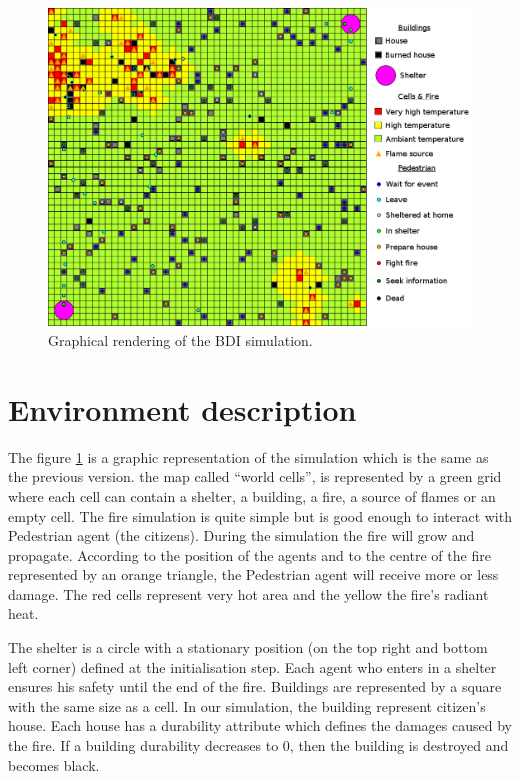 \documentclass[12pt, a4paper]{memoir} %
\begin{document}
	\begin{figure}
		\begin{center}
			\includegraphics[scale=0.4]{simu-legends.png}
			\caption{\label{fig:simulation}Graphical rendering of the BDI simulation.}
		\end{center}
	\end{figure}

	\section{Environment description}

		The figure \ref{fig:simulation} is a graphic representation of the simulation which is the same as the previous version.
		 the map called \textquotedblleft world cells\textquotedblright,
		is represented by a green grid where each cell can contain a shelter, a building, a fire, a source of flames or an empty cell.
		The fire simulation is quite simple but is good enough to interact with Pedestrian agent (the citizens).
		During the simulation the fire will grow and propagate.
		According to the position of the agents and to the centre of the fire represented by an orange triangle, the Pedestrian agent
		will receive more or less damage. The red cells represent very hot area and the yellow the fire's radiant heat.

		The shelter is a circle with a stationary position (on the top right and bottom left corner) defined at the initialisation step.
		Each agent who enters in a shelter ensures his safety until the end of the fire.
		Buildings are represented by a square with the same size as a cell. In our simulation, the building represent citizen's house.
		Each house has a durability attribute which defines the damages caused by the fire. If a building durability decreases to 0,
		then the building is destroyed and becomes black.
\end{document}
